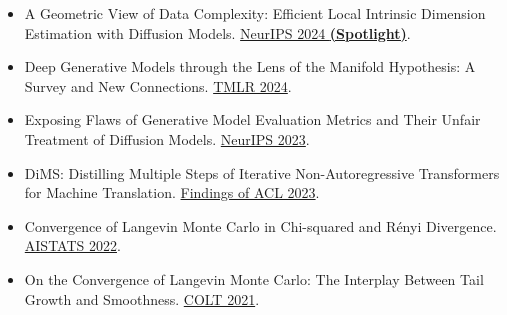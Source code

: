 \documentclass[11pt,a4paper]{article}
\begin{document}
{\begin{itemize}[noitemsep, topsep=4pt, leftmargin=0em, label=\textcolor{maincolorlight}{$\circ$}]
    \item A Geometric View of Data Complexity: Efficient Local Intrinsic Dimension Estimation with Diffusion Models. {\textcolor{venuecolor}{\href{https://proceedings.neurips.cc/paper_files/paper/2024/hash/43ab1646052dab79731f5d70bf40f6dc-Abstract-Conference.html}{NeurIPS 2024 \mbox{\textbf{(Spotlight)}}}}}.
    \item Deep Generative Models through the Lens of the Manifold Hypothesis: A Survey and New Connections. {\textcolor{venuecolor}{\href{https://openreview.net/forum?id=a90WpmSi0I}{TMLR 2024}}}.
    \item Exposing Flaws of Generative Model Evaluation Metrics and Their Unfair Treatment of Diffusion Models. {\textcolor{venuecolor}{\href{https://papers.nips.cc/paper_files/paper/2023/hash/0bc795afae289ed465a65a3b4b1f4eb7-Abstract-Conference.html}{NeurIPS 2023}}}.
    \item DiMS: Distilling Multiple Steps of Iterative Non-Autoregressive Transformers for Machine Translation. {\textcolor{venuecolor}{\href{https://aclanthology.org/2023.findings-acl.542}{Findings of ACL 2023}}}.
    \item Convergence of Langevin Monte Carlo in Chi-squared and R\'enyi Divergence. {\textcolor{venuecolor}{\href{https://proceedings.mlr.press/v151/erdogdu22a.html}{AISTATS 2022}}}.
    \item On the Convergence of Langevin Monte Carlo: The Interplay Between Tail Growth and Smoothness. {\textcolor{venuecolor}{\href{https://proceedings.mlr.press/v134/erdogdu21a.html}{COLT 2021}}}.
\end{itemize}
}
\end{document}
